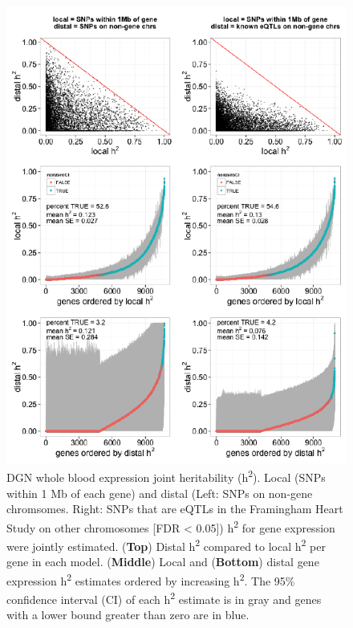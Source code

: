 \documentclass[]{article}
\begin{document}
\begin{figure}[htbp]
\centering
\includegraphics{GenArch_manuscript_files/figure-latex/jointH2-1.pdf}
\caption{DGN whole blood expression joint heritability
(h\textsuperscript{2}). Local (SNPs within 1 Mb of each gene) and distal
(Left: SNPs on non-gene chromsomes. Right: SNPs that are eQTLs in the
Framingham Heart Study on other chromosomes {[}FDR \textless{} 0.05{]})
h\textsuperscript{2} for gene expression were jointly estimated.
(\textbf{Top}) Distal h\textsuperscript{2} compared to local
h\textsuperscript{2} per gene in each model. (\textbf{Middle}) Local and
(\textbf{Bottom}) distal gene expression h\textsuperscript{2} estimates
ordered by increasing h\textsuperscript{2}. The 95\% confidence interval
(CI) of each h\textsuperscript{2} estimate is in gray and genes with a
lower bound greater than zero are in blue.}
\end{figure}
\end{document}
